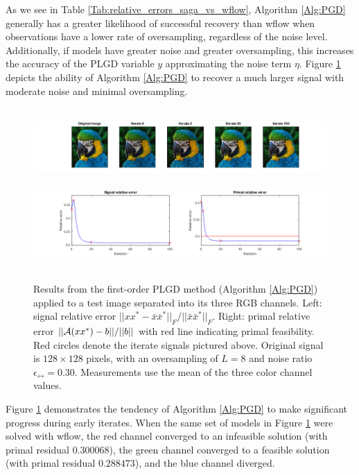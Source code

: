 As we see in Table \ref{Tab:relative_errors_saga_vs_wflow}, Algorithm \ref{Alg:PGD} generally has a greater likelihood of successful recovery than wflow when observations have a lower rate of oversampling, regardless of the noise level.  
Additionally, if models have greater noise and greater oversampling, this increases the accuracy of the PLGD variable $y$ approximating the noise term $\eta$.
Figure \ref{Fig:parrot_signal_relative_error_2} depicts the ability of Algorithm \ref{Alg:PGD} to recover a much larger signal with moderate noise and minimal oversampling.

\begin{figure}[H]
\centering
\hbox{\hspace{-2.3cm} \includegraphics[scale=0.55]{parrot_signal_iterates} }
\hbox{\hspace{-2.5cm} \includegraphics[scale=0.6]{parrot_signal_relative_error_2} }
\caption{Results from the first-order PLGD method (Algorithm \ref{Alg:PGD}) applied to a test image separated into its three RGB channels.  Left: signal relative error $||xx^*- \bar{x}\bar{x}^*||_F / ||\bar{x}\bar{x}^*||_F$.  Right: primal relative error $||{\mathcal A}(xx^*)-b|| /  ||b||$ with red line indicating primal feasibility.  Red circles denote the iterate signals pictured above.  Original signal is $128 \times 128$ pixels, with an oversampling of $L = 8$ and noise ratio $\epsilon_\rel = 0.30$.  Measurements use the mean of the three color channel values.}
\label{Fig:parrot_signal_relative_error_2}
\end{figure}

Figure \ref{Fig:parrot_signal_relative_error_2} demonstrates the tendency of Algorithm \ref{Alg:PGD} to make significant progress during early iterates.  When the same set of models in Figure \ref{Fig:parrot_signal_relative_error_2} were solved with wflow, the red channel converged to an infeasible solution (with primal residual $0.300068$), the green channel converged to a feasible solution (with primal residual $0.288473$), and the blue channel diverged.  





